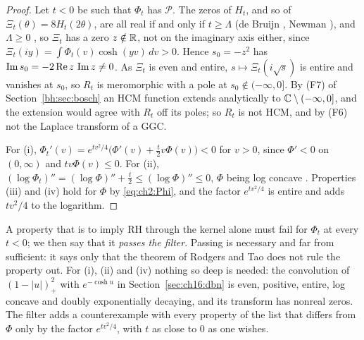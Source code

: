 \begin{proof}
Let $t<0$ be such that $\Phi_t$ has $\mathcal P$. The zeros of $H_t$, and so of $\Xi_t(\theta)=8H_t(2\theta)$, are all real if and only if $t\ge\Lambda$ (de Bruijn \cite{deBruijn}, Newman \cite{Newman1976}), and $\Lambda\ge0$ \cite{RodgersTao}, so $\Xi_t$ has a zero $z\notin\mathbb{R}$, not on the imaginary axis either, since $\Xi_t(iy)=\int\Phi_t(v)\cosh(yv)\,dv>0$. Hence $s_0=-z^2$ has $\operatorname{Im} s_0=-2\operatorname{Re} z\,\operatorname{Im} z\ne0$. As $\Xi_t$ is even and entire, $s\mapsto\Xi_t(i\sqrt s)$ is entire and vanishes at $s_0$, so $R_t$ is meromorphic with a pole at $s_0\notin(-\infty,0]$. By (F7) of Section~\ref{bh:sec:bosch} an HCM function extends analytically to $\mathbb{C}\setminus(-\infty,0]$, and the extension would agree with $R_t$ off its poles; so $R_t$ is not HCM, and by (F6) not the Laplace transform of a GGC.

For (i), $\Phi_t'(v)=e^{tv^2/4}\big(\Phi'(v)+\frac t2v\Phi(v)\big)<0$ for $v>0$, since $\Phi'<0$ on $(0,\infty)$ \cite[Theorem A]{CNV86} and $tv\Phi(v)\le0$. For (ii), $(\log\Phi_t)''=(\log\Phi)''+\frac t2\le(\log\Phi)''\le0$, $\Phi$ being log concave \cite{CC13}. Properties (iii) and (iv) hold for $\Phi$ by \eqref{eq:ch2:Phi}, and the factor $e^{tv^2/4}$ is entire and adds $tv^2/4$ to the logarithm.
\end{proof}

A property that is to imply RH through the kernel alone must fail for $\Phi_t$ at every $t<0$; we then say that it \emph{passes the filter}. Passing is necessary and far from sufficient: it says only that the theorem of Rodgers and Tao does not rule the property out. For (i), (ii) and (iv) nothing so deep is needed: the convolution of $(1-|u|)_+^2$ with $e^{-\cosh u}$ in Section~\ref{sec:ch16:dbn} is even, positive, entire, log concave and doubly exponentially decaying, and its transform has nonreal zeros. The filter adds a counterexample with every property of the list that differs from $\Phi$ only by the factor $e^{tv^2/4}$, with $t$ as close to $0$ as one wishes.

